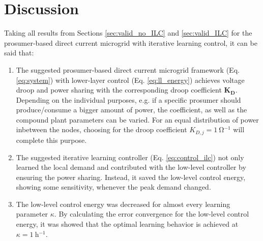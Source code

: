 \section{Discussion}
Taking all results from Sections \ref{sec:valid_no_ILC} and \ref{sec:valid_ILC} for the prosumer-based direct current microgrid with iterative learning control, it can be said that:
\begin{enumerate}
	\item The suggested prosumer-based direct current microgrid framework (Eq. \ref{eq:system}) with lower-layer control (Eq. \ref{eq:ll_energy}) achieves voltage droop and power sharing with the corresponding droop coefficient $\boldsymbol{K_{D}}$. Depending on the individual purposes, e.g. if a specific prosumer should produce/consume a bigger amount of power, the coefficient, as well as the compound plant parameters can be varied. For an equal distribution of power inbetween the nodes, choosing for the droop coefficient $K_{D,j} = \SI{1}{\ohm^{-1}}$ will complete this purpose.
	\item The suggested iterative learning controller (Eq. \ref{eq:control_ilc}) not only learned the local demand and contributed with the low-level controller by ensuring the power sharing. Instead, it saved the low-level control energy, showing some sensitivity, whenever the peak demand changed.
	\item The low-level control energy was decreased for almost every learning parameter $\kappa$. By calculating the error convergence for the low-level control energy, it was showed that the optimal learning behavior is achieved at $\kappa = \SI{1}{\hour^{-1}}$. 
\end{enumerate}
